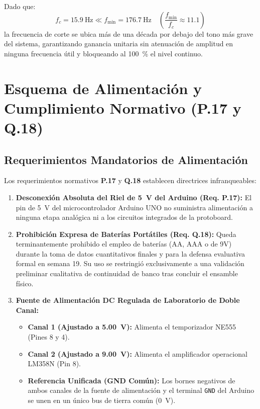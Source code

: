 \documentclass[11pt,letterpaper]{article}
\begin{document}
Dado que:
\begin{equation}
f_c = \SI{15.9}{\hertz} \ll f_{\text{min}} = \SI{176.7}{\hertz} \quad \left(\frac{f_{\text{min}}}{f_c} \approx 11.1\right)
\end{equation}
la frecuencia de corte se ubica más de una década por debajo del tono más grave del sistema, garantizando ganancia unitaria sin atenuación de amplitud en ninguna frecuencia útil y bloqueando al \SI{100}{\percent} el nivel continuo.

\section{Esquema de Alimentación y Cumplimiento Normativo (P.17 y Q.18)}

\subsection{Requerimientos Mandatorios de Alimentación}
Los requerimientos normativos \textbf{P.17} y \textbf{Q.18} establecen directrices infranqueables:
\begin{enumerate}
    \item \textbf{Desconexión Absoluta del Riel de \SI{+5}{\volt} del Arduino (Req. P.17):} El pin de \SI{+5}{\volt} del microcontrolador Arduino UNO no suministra alimentación a ninguna etapa analógica ni a los circuitos integrados de la protoboard.
    \item \textbf{Prohibición Expresa de Baterías Portátiles (Req. Q.18):} Queda terminantemente prohibido el empleo de baterías (AA, AAA o de 9V) durante la toma de datos cuantitativos finales y para la defensa evaluativa formal en semana 19. Su uso se restringió exclusivamente a una validación preliminar cualitativa de continuidad de banco tras concluir el ensamble físico.
    \item \textbf{Fuente de Alimentación DC Regulada de Laboratorio de Doble Canal:}
    \begin{itemize}
        \item \textbf{Canal 1 (Ajustado a \SI{+5.00}{\volt}):} Alimenta el temporizador NE555 (Pines 8 y 4).
        \item \textbf{Canal 2 (Ajustado a \SI{+9.00}{\volt}):} Alimenta el amplificador operacional LM358N (Pin 8).
        \item \textbf{Referencia Unificada (GND Común):} Los bornes negativos de ambos canales de la fuente de alimentación y el terminal \texttt{GND} del Arduino se unen en un único bus de tierra común (\SI{0}{\volt}).
    \end{itemize}
\end{enumerate}
\end{document}
